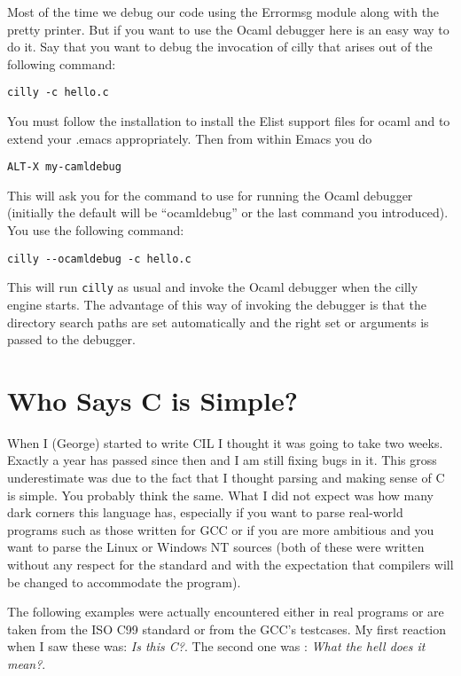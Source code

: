\documentclass{article}
\def\t#1{{\tt #1}}
\begin{document}
 Most of the time we debug our code using the Errormsg module along with the
pretty printer. But if you want to use the Ocaml debugger here is an easy way
to do it. Say that you want to debug the invocation of cilly that arises out
of the following command:
\begin{verbatim}
cilly -c hello.c 
\end{verbatim}

 You must follow the installation 
to install the Elist support files for ocaml and to extend your .emacs
appropriately. Then from within Emacs you do
\begin{verbatim}
ALT-X my-camldebug
\end{verbatim}

 This will ask you for the command to use for running the Ocaml debugger
(initially the default will be ``ocamldebug'' or the last command you
introduced). You use the following command:
\begin{verbatim}
cilly --ocamldebug -c hello.c 
\end{verbatim}

 This will run \t{cilly} as usual and invoke the Ocaml debugger when the cilly
engine starts. The advantage of this way of invoking the debugger is that the
directory search paths are set automatically and the right set or arguments is
passed to the debugger. 


\section{Who Says C is Simple?}\label{sec-simplec}

 When I (George) started to write CIL I thought it was going to take two weeks.
Exactly a year has passed since then and I am still fixing bugs in it. This
gross underestimate was due to the fact that I thought parsing and making
sense of C is simple. You probably think the same. What I did not expect was
how many dark corners this language has, especially if you want to parse
real-world programs such as those written for GCC or if you are more ambitious
and you want to parse the Linux or Windows NT sources (both of these were
written without any respect for the standard and with the expectation that
compilers will be changed to accommodate the program). 

 The following examples were actually encountered either in real programs or
are taken from the ISO C99 standard or from the GCC's testcases. My first
reaction when I saw these was: {\em Is this C?}. The second one was : {\em
What the hell does it mean?}. 
\end{document}
